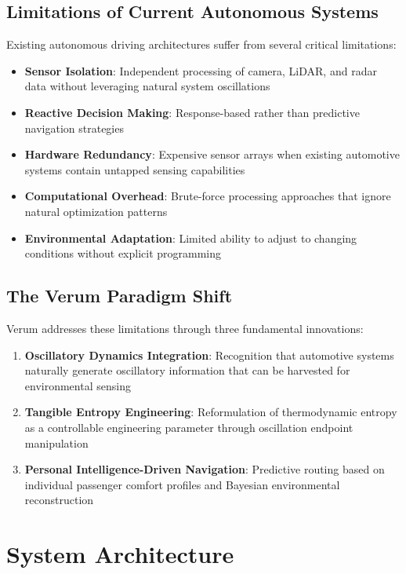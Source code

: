 \documentclass[11pt,a4paper]{article}
\begin{document}
\subsection{Limitations of Current Autonomous Systems}

Existing autonomous driving architectures suffer from several critical limitations:

\begin{itemize}
    \item \textbf{Sensor Isolation}: Independent processing of camera, LiDAR, and radar data without leveraging natural system oscillations
    \item \textbf{Reactive Decision Making}: Response-based rather than predictive navigation strategies
    \item \textbf{Hardware Redundancy}: Expensive sensor arrays when existing automotive systems contain untapped sensing capabilities
    \item \textbf{Computational Overhead}: Brute-force processing approaches that ignore natural optimization patterns
    \item \textbf{Environmental Adaptation}: Limited ability to adjust to changing conditions without explicit programming
\end{itemize}

\subsection{The Verum Paradigm Shift}

Verum addresses these limitations through three fundamental innovations:

\begin{enumerate}
    \item \textbf{Oscillatory Dynamics Integration}: Recognition that automotive systems naturally generate oscillatory information that can be harvested for environmental sensing
    \item \textbf{Tangible Entropy Engineering}: Reformulation of thermodynamic entropy as a controllable engineering parameter through oscillation endpoint manipulation
    \item \textbf{Personal Intelligence-Driven Navigation}: Predictive routing based on individual passenger comfort profiles and Bayesian environmental reconstruction
\end{enumerate}

\section{System Architecture}
\end{document}
